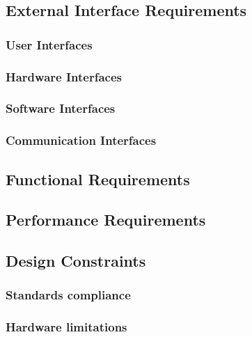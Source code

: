 
\subsection{External Interface Requirements}

\subsubsection{User Interfaces}

\subsubsection{Hardware Interfaces}

\subsubsection{Software Interfaces}

\subsubsection{Communication Interfaces}


\subsection{Functional Requirements}


\subsection{Performance Requirements}


\subsection{Design Constraints}

\subsubsection{Standards compliance}

\subsubsection{Hardware limitations}

